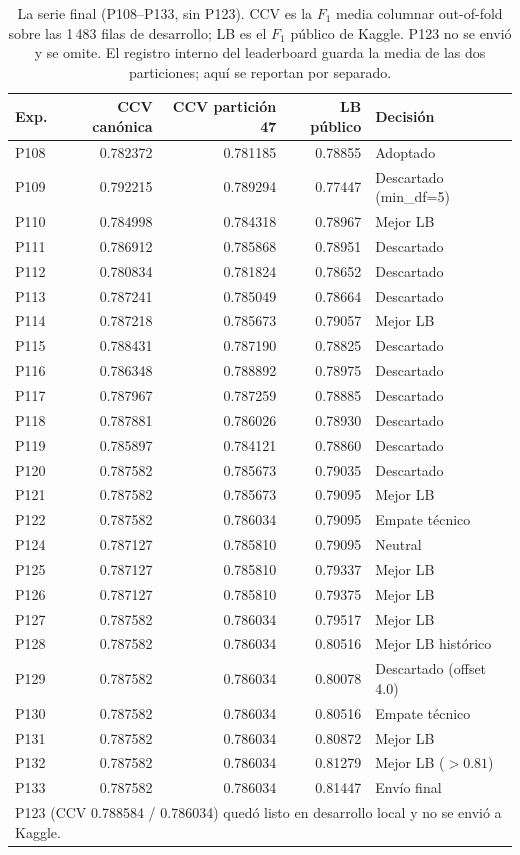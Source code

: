 \begin{table}[t]
\centering
\caption{La serie final (P108--P133, sin P123). CCV es la $F_1$ media
columnar out-of-fold sobre las 1\,483 filas de desarrollo; LB es el $F_1$
público de Kaggle. P123 no se envió y se omite. El registro interno del
leaderboard guarda la media de las dos particiones; aquí se reportan por
separado.}
\label{tab:serie}
\scriptsize
\setlength{\tabcolsep}{4.5pt}
\begin{tabular*}{\textwidth}{@{\extracolsep{\fill}}lrrrl@{}}
\toprule
Exp. & CCV canónica & CCV partición 47 & LB público & Decisión \\
\midrule
P108 & 0.782372 & 0.781185 & 0.78855 & Adoptado \\
P109 & 0.792215 & 0.789294 & 0.77447 & Descartado (min\_df=5) \\
P110 & 0.784998 & 0.784318 & 0.78967 & Mejor LB \\
P111 & 0.786912 & 0.785868 & 0.78951 & Descartado \\
P112 & 0.780834 & 0.781824 & 0.78652 & Descartado \\
P113 & 0.787241 & 0.785049 & 0.78664 & Descartado \\
P114 & 0.787218 & 0.785673 & 0.79057 & Mejor LB \\
P115 & 0.788431 & 0.787190 & 0.78825 & Descartado \\
P116 & 0.786348 & 0.788892 & 0.78975 & Descartado \\
P117 & 0.787967 & 0.787259 & 0.78885 & Descartado \\
P118 & 0.787881 & 0.786026 & 0.78930 & Descartado \\
P119 & 0.785897 & 0.784121 & 0.78860 & Descartado \\
P120 & 0.787582 & 0.785673 & 0.79035 & Descartado \\
P121 & 0.787582 & 0.785673 & 0.79095 & Mejor LB \\
P122 & 0.787582 & 0.786034 & 0.79095 & Empate técnico \\
P124 & 0.787127 & 0.785810 & 0.79095 & Neutral \\
P125 & 0.787127 & 0.785810 & 0.79337 & Mejor LB \\
P126 & 0.787127 & 0.785810 & 0.79375 & Mejor LB \\
P127 & 0.787582 & 0.786034 & 0.79517 & Mejor LB \\
P128 & 0.787582 & 0.786034 & 0.80516 & Mejor LB histórico \\
P129 & 0.787582 & 0.786034 & 0.80078 & Descartado (offset 4.0) \\
P130 & 0.787582 & 0.786034 & 0.80516 & Empate técnico \\
P131 & 0.787582 & 0.786034 & 0.80872 & Mejor LB \\
P132 & 0.787582 & 0.786034 & 0.81279 & Mejor LB ($>0.81$) \\
P133 & 0.787582 & 0.786034 & 0.81447 & Envío final \\
\midrule
\multicolumn{5}{l}{\scriptsize * P123 (CCV 0.788584 / 0.786034) quedó listo en desarrollo local y no se envió a Kaggle.} \\
\bottomrule
\end{tabular*}
\end{table}

